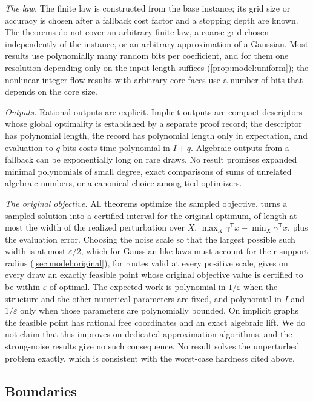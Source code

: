 \emph{The law.} The finite law is constructed from the base instance; its
grid size or accuracy is chosen after a fallback cost factor and a stopping
depth are known. The theorems do not cover an arbitrary finite law, a coarse
grid chosen independently of the instance, or an arbitrary approximation of
a Gaussian. Most results use polynomially many random bits per coefficient,
and for them one resolution depending only on the input length suffices
(\cref{prop:model:uniform}); the nonlinear integer-flow results with
arbitrary core faces use a number of bits that depends on the core size.

\emph{Outputs.} Rational outputs are explicit. Implicit outputs are compact
descriptors whose global optimality is established by a separate proof
record; the descriptor has polynomial length, the record has polynomial
length only in expectation, and evaluation to $q$ bits costs time
polynomial in $I+q$. Algebraic outputs from a fallback can be exponentially
long on rare draws. No result promises expanded minimal polynomials of small
degree, exact comparisons of sums of unrelated algebraic numbers, or a
canonical choice among tied optimizers.

\emph{The original objective.} All theorems optimize the sampled objective.
 turns a sampled solution into a certified interval
for the original optimum, of length at most the width of the realized
perturbation over $X$, $\max_X\gamma^{\mathsf T}x-\min_X\gamma^{\mathsf T}x$,
plus the evaluation error. Choosing the noise scale so that the largest
possible such width is at most $\varepsilon/2$, which for Gaussian-like laws
must account for their support radius (\cref{sec:model:original}), for routes valid at every positive scale, gives
on every draw an exactly feasible point whose original objective value is
certified to be within $\varepsilon$ of optimal. The expected work is
polynomial in $1/\varepsilon$ when the structure and the other numerical
parameters are fixed, and polynomial in $I$ and $1/\varepsilon$ only when
those parameters are polynomially bounded. On implicit graphs the
feasible point has rational free coordinates and an exact algebraic lift. We
do not claim that this improves on dedicated approximation algorithms, and
the strong-noise results give no such consequence. No result solves the unperturbed problem exactly,
which is consistent with the worst-case hardness cited above.

\subsection{Boundaries}\label{sec:intro:boundaries}

